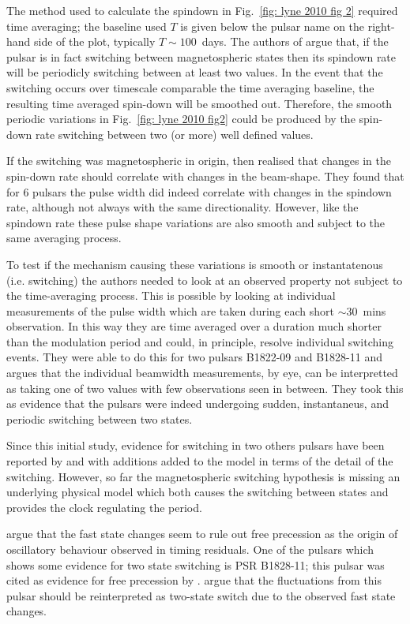 The method used to calculate the spindown in Fig.~\ref{fig: lyne 2010 fig 2}
required time averaging; the baseline used $T$ is given below the pulsar name
on the right-hand side of the plot, typically $T\sim100$~days. The authors of
\citet{Lyne2010} argue that, if the pulsar is in fact switching between
magnetospheric states then its spindown rate will be periodicly switching
between at least two values. In the event that the switching occurs over
timescale comparable the time averaging baseline, the resulting time averaged
spin-down will be smoothed out. Therefore, the smooth periodic variations in
Fig.~\ref{fig: lyne 2010 fig2} could be produced by the spin-down rate
switching between two (or more) well defined values.

If the switching was magnetospheric in origin, then \citet{Lyne2010} realised
that changes in the spin-down rate should correlate with changes in the
beam-shape.  They found that for 6 pulsars the pulse width did indeed correlate
with changes in the spindown rate, although not always with the same
directionality.  However, like the spindown rate these pulse shape variations
are also smooth and subject to the same averaging process.

To test if the mechanism causing these variations is smooth or instantatenous
(i.e. switching) the authors needed to look at an observed property not subject
to the time-averaging process.  This is possible by looking at individual
measurements of the pulse width which are taken during each short $\sim30$~mins
observation. In this way they are time averaged over a duration much shorter
than the modulation period and could, in principle, resolve individual
switching events. They were able to do this for two pulsars B1822-09 and
B1828-11 and argues that the individual beamwidth measurements, by eye, can be
interpretted as taking one of two values with few observations seen in between.
They took this as evidence that the pulsars were indeed undergoing sudden,
instantaneus, and periodic switching between two states.

Since this initial study, evidence for switching in two others pulsars have
been reported by \citet{Perera2014} and \citet{Perera2016} with additions added
to the model in terms of the detail of the switching. However, so far the
magnetospheric switching hypothesis is missing an underlying physical model
which both causes the switching between states and provides the clock regulating
the period.

\citet{Lyne2010} argue that the fast state changes seem to rule out free
precession as the origin of oscillatory behaviour observed in timing residuals.
One of the pulsars which shows some evidence for two state switching is PSR
B1828-11; this pulsar was cited as evidence for free precession by
\citet{Akgun2006}. \citet{Lyne2010} argue that the fluctuations from this pulsar
should be reinterpreted as two-state switch due to the observed fast state
changes.

